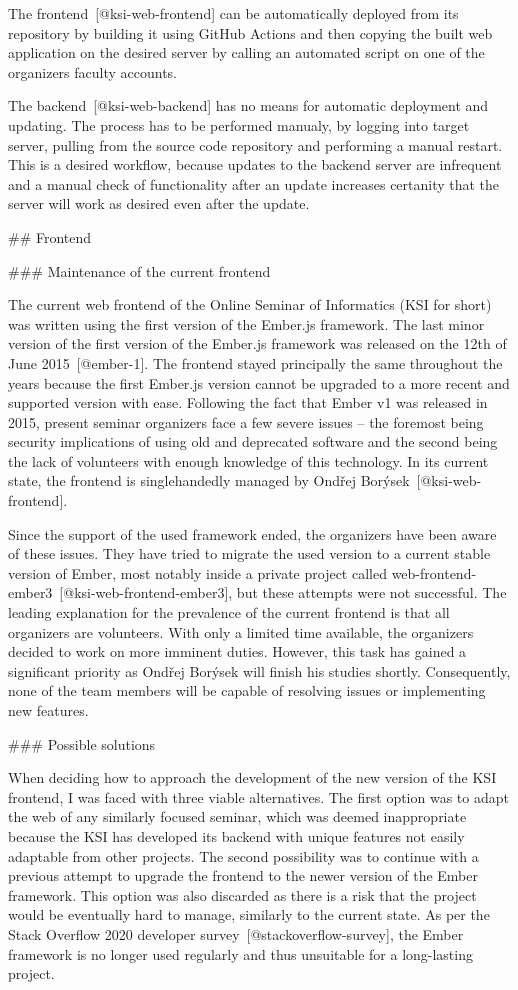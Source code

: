 \documentclass[
  digital, %
  oneside, %
  lof,     %
  nolot,     %
]{fithesis4}
\begin{document}
The frontend~[@ksi-web-frontend] can be automatically deployed from its repository by building it using GitHub Actions and then copying the built web application on the desired server by calling an automated script on one of the organizers faculty accounts.

The backend~[@ksi-web-backend] has no means for automatic deployment and updating. The process has to be performed manualy, by logging into target server, pulling from the source code repository and performing a manual restart. This is a desired workflow, because updates to the backend server are infrequent and a manual check of functionality after an update increases certanity that the server will work as desired even after the update.

## Frontend

### Maintenance of the current frontend

The current web frontend of the Online Seminar of Informatics (KSI for short) was written using the first version of the Ember.js framework. The last minor version of the first version of the Ember.js framework was released on the 12th of June 2015~[@ember-1]. The frontend stayed principally the same throughout the years because the first Ember.js version cannot be upgraded to a more recent and supported version with ease. Following the fact that Ember v1 was released in 2015, present seminar organizers face a few severe issues -- the foremost being security implications of using old and deprecated software and the second being the lack of volunteers with enough knowledge of this technology. In its current state, the frontend is singlehandedly managed by Ondřej Borýsek~[@ksi-web-frontend].

Since the support of the used framework ended, the organizers have been aware of these issues. They have tried to migrate the used version to a current stable version of Ember, most notably inside a private project called web-frontend-ember3~[@ksi-web-frontend-ember3], but these attempts were not successful. The leading explanation for the prevalence of the current frontend is that all organizers are volunteers. With only a limited time available, the organizers decided to work on more imminent duties. However, this task has gained a significant priority as Ondřej Borýsek will finish his studies shortly. Consequently, none of the team members will be capable of resolving issues or implementing new features.

### Possible solutions

When deciding how to approach the development of the new version of the KSI frontend, I was faced with three viable alternatives. The first option was to adapt the web of any similarly focused seminar, which was deemed inappropriate because the KSI has developed its backend with unique features not easily adaptable from other projects. The second possibility was to continue with a previous attempt to upgrade the frontend to the newer version of the Ember framework. This option was also discarded as there is a risk that the project would be eventually hard to manage, similarly to the current state. As per the Stack Overflow 2020 developer survey~[@stackoverflow-survey], the Ember framework is no longer used regularly and thus unsuitable for a long-lasting project.
\end{document}
